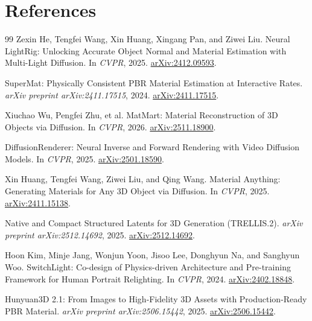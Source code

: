 \documentclass[11pt]{article}
\begin{document}
\section*{References}

\begin{thebibliography}{99}
  Zexin He, Tengfei Wang, Xin Huang, Xingang Pan, and Ziwei Liu.
  \newblock Neural LightRig: Unlocking Accurate Object Normal and Material Estimation with Multi-Light Diffusion.
  \newblock In \emph{CVPR}, 2025.
  \newblock \href{https://arxiv.org/abs/2412.09593}{arXiv:2412.09593}.

  SuperMat: Physically Consistent PBR Material Estimation at Interactive Rates.
  \newblock \emph{arXiv preprint arXiv:2411.17515}, 2024.
  \newblock \href{https://arxiv.org/abs/2411.17515}{arXiv:2411.17515}.

  Xiuchao Wu, Pengfei Zhu, et al.
  \newblock MatMart: Material Reconstruction of 3D Objects via Diffusion.
  \newblock In \emph{CVPR}, 2026.
  \newblock \href{https://arxiv.org/abs/2511.18900}{arXiv:2511.18900}.

  DiffusionRenderer: Neural Inverse and Forward Rendering with Video Diffusion Models.
  \newblock In \emph{CVPR}, 2025.
  \newblock \href{https://arxiv.org/abs/2501.18590}{arXiv:2501.18590}.

  Xin Huang, Tengfei Wang, Ziwei Liu, and Qing Wang.
  \newblock Material Anything: Generating Materials for Any 3D Object via Diffusion.
  \newblock In \emph{CVPR}, 2025.
  \newblock \href{https://arxiv.org/abs/2411.15138}{arXiv:2411.15138}.

  Native and Compact Structured Latents for 3D Generation (TRELLIS.2).
  \newblock \emph{arXiv preprint arXiv:2512.14692}, 2025.
  \newblock \href{https://arxiv.org/abs/2512.14692}{arXiv:2512.14692}.

  Hoon Kim, Minje Jang, Wonjun Yoon, Jisoo Lee, Donghyun Na, and Sanghyun Woo.
  \newblock SwitchLight: Co-design of Physics-driven Architecture and Pre-training Framework for Human Portrait Relighting.
  \newblock In \emph{CVPR}, 2024.
  \newblock \href{https://arxiv.org/abs/2402.18848}{arXiv:2402.18848}.

  Hunyuan3D 2.1: From Images to High-Fidelity 3D Assets with Production-Ready PBR Material.
  \newblock \emph{arXiv preprint arXiv:2506.15442}, 2025.
  \newblock \href{https://arxiv.org/abs/2506.15442}{arXiv:2506.15442}.


\end{thebibliography}
\end{document}
